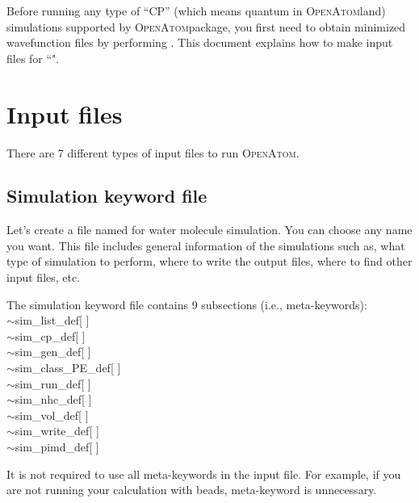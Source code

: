 \documentclass[letterpaper,12pt]{article}
\title{\fontfamily{phv}\selectfont{\openatom: Get started}}
\date{}
\newcommand{\openatom}{\textsc{OpenAtom}}
\begin{document}
\maketitle

Before running any type of ``CP'' (which means quantum in \openatom land) simulations supported by \openatom package, you first need to obtain minimized wavefunction files by performing {\selectfont{cp\_wave\_min}}. 
This document explains how to make input files for ``{\selectfont{cp\_wave\_min}}".


\section{Input files}

There are 7 different types of input files to run \openatom. 

\subsection{Simulation keyword file}

Let's create a file named {\selectfont{water.input}} for water molecule simulation. You can choose any name you want. This file includes general information of the simulations such as, what  type of simulation to perform, where to write the output files, where to find other input files, etc. 

The simulation keyword file contains 9 subsections (i.e., meta-keywords):\\
{\selectfont
$\sim$sim\_list\_def[ ]\\
$\sim$sim\_cp\_def[ ]\\
$\sim$sim\_gen\_def[ ]\\
$\sim$sim\_class\_PE\_def[ ]\\
$\sim$sim\_run\_def[ ]\\
$\sim$sim\_nhc\_def[ ]\\
$\sim$sim\_vol\_def[ ]\\
$\sim$sim\_write\_def[ ]\\
$\sim$sim\_pimd\_def[ ]\\
}

It is not required to use all meta-keywords in the input file. For example, if you are not running your calculation with beads, {\selectfont{sim\_pimd\_def[]}} meta-keyword is unnecessary. 
\end{document}
